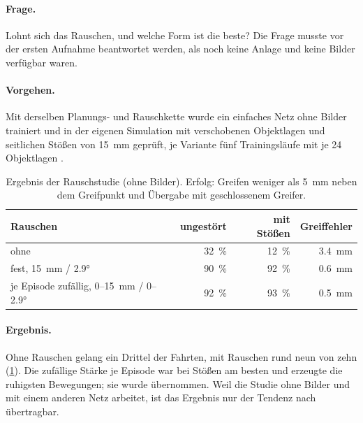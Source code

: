 \paragraph{Frage.} Lohnt sich das Rauschen, und welche Form ist die beste? Die Frage musste vor
der ersten Aufnahme beantwortet werden, als noch keine Anlage und keine Bilder verfügbar waren.

\paragraph{Vorgehen.} Mit derselben Planungs- und Rauschkette wurde ein einfaches Netz ohne
Bilder trainiert und in der eigenen Simulation mit verschobenen Objektlagen und seitlichen
Stößen von \SI{15}{\milli\metre} geprüft, je Variante fünf Trainingsläufe mit je 24
Objektlagen .

\begin{table}[htbp]
  \centering
  \caption[Ergebnis der Rauschstudie]{Ergebnis der Rauschstudie (ohne Bilder). Erfolg:
  Greifen weniger als \SI{5}{\milli\metre} neben dem Greifpunkt und Übergabe mit geschlossenem
  Greifer.}
  \label{tab:rauschstudie}
  \begin{tabularx}{\textwidth}{@{}X r r r@{}}
    \toprule
    Rauschen & ungestört & mit Stößen & Greiffehler \\
    \midrule
    ohne & \SI{32}{\percent} & \SI{12}{\percent} & \SI{3.4}{\milli\metre} \\
    fest, \SI{15}{\milli\metre} / \ang{2.9} & \SI{90}{\percent} & \SI{92}{\percent} & \SI{0.6}{\milli\metre} \\
    je Episode zufällig, 0--\SI{15}{\milli\metre} / 0--\ang{2.9} & \SI{92}{\percent} & \SI{93}{\percent} & \SI{0.5}{\milli\metre} \\
    \bottomrule
  \end{tabularx}
\end{table}

\paragraph{Ergebnis.} Ohne Rauschen gelang ein Drittel der Fahrten, mit Rauschen rund neun von
zehn (\cref{tab:rauschstudie}). Die zufällige Stärke je Episode war bei Stößen am besten und
erzeugte die ruhigsten Bewegungen; sie wurde übernommen. Weil die Studie ohne Bilder und mit
einem anderen Netz arbeitet, ist das Ergebnis nur der Tendenz nach übertragbar.

